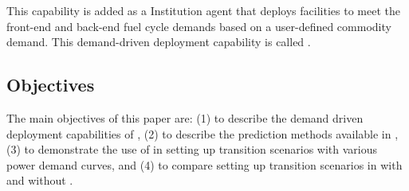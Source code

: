 This capability is added as a \Cyclus Institution
agent that deploys facilities to meet the front-end and back-end 
fuel cycle demands based on a user-defined commodity demand. 
This demand-driven deployment capability is called 
\deploy. 

\subsection{Objectives}
The main objectives of this paper are: 
(1) to describe the demand driven deployment capabilities of 
\Cyclus, (2) to describe the prediction methods available in 
\deploy, (3) to demonstrate the use of \deploy in setting up 
transition scenarios with various power demand curves, and (4) 
to compare setting up transition scenarios in \Cyclus with and 
without \deploy. 